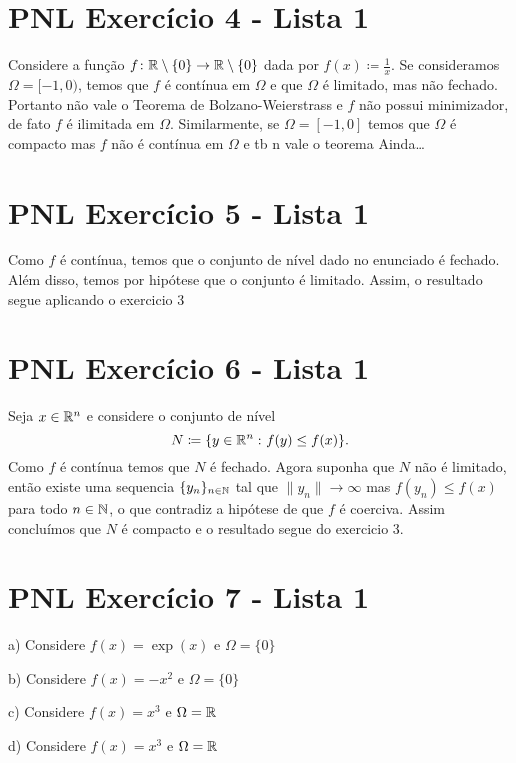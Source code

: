 \documentclass[12pt,twoside,a4paper]{book}
\begin{document}
\section{PNL Exercício 4 - Lista 1}
\label{sec:org026ff9d}

Considere a função \(f\colon\mathbb{R}\setminus\{0\}\to\mathbb{R}\setminus\{0\}\) dada por \(f(x)\coloneqq\frac{1}{x}\). Se consideramos
\(\Omega=[-1,0)\), temos que \(f\) é contínua em \(\Omega\) e que \(\Omega\) é limitado, mas não fechado.
Portanto não vale o Teorema de Bolzano-Weierstrass e \(f\) não possui minimizador, de fato \(f\) é ilimitada em \(\Omega\).
Similarmente, se \(\Omega=[-1,0]\) temos que \(\Omega\) é compacto mas \(f\) não é contínua em \(\Omega\) e tb n vale o teorema
Ainda\ldots{}

\section{PNL Exercício 5 - Lista 1}
\label{sec:org5714b88}

Como \(f\) é contínua, temos que o conjunto de nível dado no enunciado é fechado. Além disso, temos
por hipótese que o conjunto é limitado. Assim, o resultado segue aplicando o exercicio 3

\section{PNL Exercício 6 - Lista 1}
\label{sec:orga03c240}

Seja \(x\in\mathbb{R}^n\) e considere o conjunto de nível \[N\coloneqq\{y\in\mathbb{R}^n\,\colon f(y)\leq f(x)\}.\]
Como \(f\) é contínua temos que \(N\) é fechado. Agora suponha que \(N\) não é limitado,
então existe uma sequencia \(\{y_n\}_{n\in\mathbb{N}}\) tal que \(\|y_n\|\rightarrow\infty\) mas \(f(y_n)\leq f(x)\) para
todo \(n\in\mathbb{N}\), o que contradiz a hipótese de que \(f\) é coerciva. Assim concluímos que \(N\) é compacto e o resultado 
segue do exercicio 3.

\section{PNL Exercício 7 - Lista 1}
\label{sec:org290910a}
a) Considere \(f(x)=\exp(x)\) e \(\Omega=\{0\}\)

b) Considere \(f(x)=-x^2\) e \(\Omega=\{0\}\)

c) Considere \(f(x)=x^3\) e \(\Omega=\mathbb{R}\)

d) Considere \(f(x)=x^3\) e \(\Omega=\mathbb{R}\)
\end{document}
